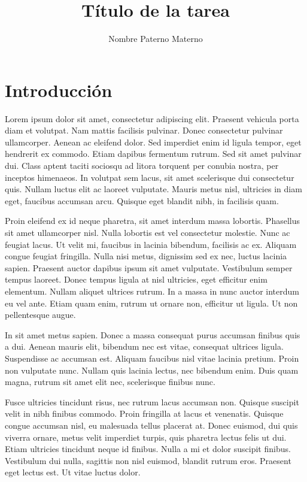 \documentclass[letterpaper, 12pt, spanish]{article}
\author{Nombre Paterno Materno}
\title{Título de la tarea}
\begin{document}
\maketitle

\section{Introducción}
Lorem ipsum dolor sit amet, consectetur adipiscing elit. Praesent vehicula porta diam et volutpat. Nam mattis facilisis pulvinar. Donec consectetur pulvinar ullamcorper. Aenean ac eleifend dolor. Sed imperdiet enim id ligula tempor, eget hendrerit ex commodo. Etiam dapibus fermentum rutrum. Sed sit amet pulvinar dui. Class aptent taciti sociosqu ad litora torquent per conubia nostra, per inceptos himenaeos. In volutpat sem lacus, sit amet scelerisque dui consectetur quis. Nullam luctus elit ac laoreet vulputate. Mauris metus nisl, ultricies in diam eget, faucibus accumsan arcu. Quisque eget blandit nibh, in facilisis quam.

Proin eleifend ex id neque pharetra, sit amet interdum massa lobortis. Phasellus sit amet ullamcorper nisl. Nulla lobortis est vel consectetur molestie. Nunc ac feugiat lacus. Ut velit mi, faucibus in lacinia bibendum, facilisis ac ex. Aliquam congue feugiat fringilla. Nulla nisi metus, dignissim sed ex nec, luctus lacinia sapien. Praesent auctor dapibus ipsum sit amet vulputate. Vestibulum semper tempus laoreet. Donec tempus ligula at nisl ultricies, eget efficitur enim elementum. Nullam aliquet ultrices rutrum. In a massa in nunc auctor interdum eu vel ante. Etiam quam enim, rutrum ut ornare non, efficitur ut ligula. Ut non pellentesque augue.

In sit amet metus sapien. Donec a massa consequat purus accumsan finibus quis a dui. Aenean mauris elit, bibendum nec est vitae, consequat ultrices ligula. Suspendisse ac accumsan est. Aliquam faucibus nisl vitae lacinia pretium. Proin non vulputate nunc. Nullam quis lacinia lectus, nec bibendum enim. Duis quam magna, rutrum sit amet elit nec, scelerisque finibus nunc.

Fusce ultricies tincidunt risus, nec rutrum lacus accumsan non. Quisque suscipit velit in nibh finibus commodo. Proin fringilla at lacus et venenatis. Quisque congue accumsan nisl, eu malesuada tellus placerat at. Donec euismod, dui quis viverra ornare, metus velit imperdiet turpis, quis pharetra lectus felis ut dui. Etiam ultricies tincidunt neque id finibus. Nulla a mi et dolor suscipit finibus. Vestibulum dui nulla, sagittis non nisl euismod, blandit rutrum eros. Praesent eget lectus est. Ut vitae luctus dolor.
\end{document}
